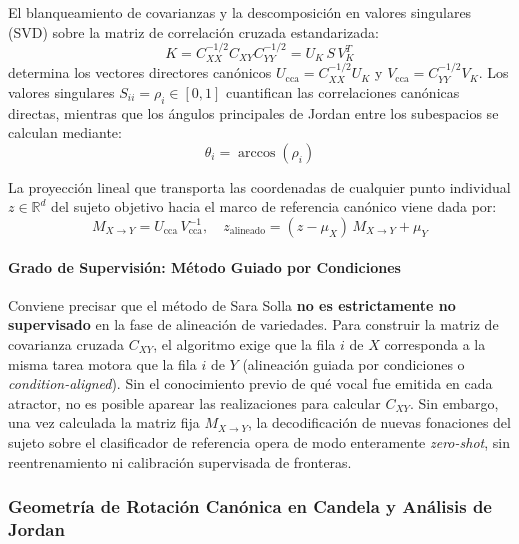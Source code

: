 \documentclass[11pt,a4paper,openany]{book}
\theoremstyle{definition}
\begin{document}
El blanqueamiento de covarianzas y la descomposición en valores singulares (SVD) sobre la matriz de correlación cruzada estandarizada:
\begin{equation}
    K = C_{XX}^{-1/2} C_{XY} C_{YY}^{-1/2} = U_K \, S \, V_K^T
\end{equation}
determina los vectores directores canónicos $U_{\text{cca}} = C_{XX}^{-1/2} U_K$ y $V_{\text{cca}} = C_{YY}^{-1/2} V_K$. Los valores singulares $S_{ii} = \rho_i \in [0, 1]$ cuantifican las correlaciones canónicas directas, mientras que los ángulos principales de Jordan entre los subespacios se calculan mediante:
\begin{equation}
    \theta_i = \arccos(\rho_i)
\end{equation}

La proyección lineal que transporta las coordenadas de cualquier punto individual $z \in \mathbb{R}^d$ del sujeto objetivo hacia el marco de referencia canónico viene dada por:
\begin{equation}
    M_{X \to Y} = U_{\text{cca}} \, V_{\text{cca}}^{-1}, \quad z_{\text{alineado}} = (z - \mu_X) \, M_{X \to Y} + \mu_Y
\end{equation}

\paragraph{Grado de Supervisión: Método Guiado por Condiciones}
Conviene precisar que el método de Sara Solla \textbf{no es estrictamente no supervisado} en la fase de alineación de variedades. Para construir la matriz de covarianza cruzada $C_{XY}$, el algoritmo exige que la fila $i$ de $X$ corresponda a la misma tarea motora que la fila $i$ de $Y$ (alineación guiada por condiciones o \textit{condition-aligned}). Sin el conocimiento previo de qué vocal fue emitida en cada atractor, no es posible aparear las realizaciones para calcular $C_{XY}$. Sin embargo, una vez calculada la matriz fija $M_{X \to Y}$, la decodificación de nuevas fonaciones del sujeto sobre el clasificador de referencia opera de modo enteramente \textit{zero-shot}, sin reentrenamiento ni calibración supervisada de fronteras.

\subsubsection{Geometría de Rotación Canónica en Candela y Análisis de Jordan}
\label{subsubsec:geometria_candela_jordan}
\end{document}
